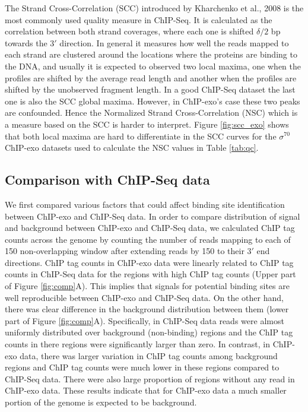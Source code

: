 \documentclass{bmcart}\usepackage[]{graphicx}\usepackage[]{color}
\newcommand{\sig}{\sigma^{70}}
\begin{document}
The Strand Cross-Correlation (SCC) introduced by Kharchenko et al.,
2008 \cite{strandcc} is the most commonly used quality measure in
ChIP-Seq. It is calculated as the correlation between both strand
coverages, where each one is shifted $\delta / 2$ bp towards the
$3\prime$ direction. In general it measures how well the reads mapped
to each strand are clustered around the locations where the proteins
are binding to the DNA, and usually it is expected to observed two
local maxima, one when the profiles are shifted by the average read
length and another when the profiles are shifted by the unobserved
fragment length. In a good ChIP-Seq dataset the last one is also the
SCC global maxima. However, in ChIP-exo's case these two peaks are
confounded. Hence the Normalized Strand Cross-Correlation (NSC) which
is a measure based on the SCC is harder to interpret. Figure
\ref{fig:scc_exo} shows that both local maxima are hard to
differentiate in the SCC curves for the $\sig$ ChIP-exo datasets used
to calculate the NSC values in Table \ref{tab:qc}.

\subsection{Comparison with ChIP-Seq data}



We first compared various factors that could affect binding site
identification between ChIP-exo and ChIP-Seq data. In order to compare
distribution of signal and background between ChIP-exo and ChIP-Seq
data, we calculated ChIP tag counts across the genome by counting the
number of reads mapping to each of 150 non-overlapping
window after extending reads by 150 to their $3\prime$
end directions. ChIP tag counts in ChIP-exo data were linearly related
to ChIP tag counts in ChIP-Seq data for the regions with high ChIP tag
counts (Upper part of Figure \ref{fig:comp}A). This implies that
signals for potential binding sites are well reproducible between
ChIP-exo and ChIP-Seq data. On the other hand, there was clear
difference in the background distribution between them (lower part of
Figure \ref{fig:comp}A). Specifically, in ChIP-Seq data reads were
almost uniformly distributed over background (non-binding) regions and
the ChIP tag counts in there regions were significantly larger than
zero. In contrast, in ChIP-exo data, there was larger variation in
ChIP tag counts among background regions and ChIP tag counts were much
lower in these regions compared to ChIP-Seq data. There were also
large proportion of regions without any read in ChIP-exo data. These
results indicate that for ChIP-exo data a much smaller portion of the
genome is expected to be background.
\end{document}
